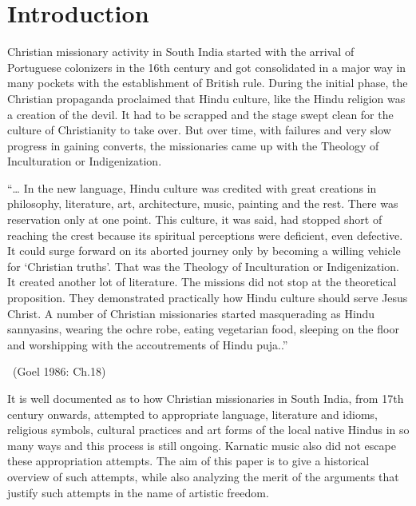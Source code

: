 \section*{Introduction}

Christian missionary activity in South India started with the arrival of Portuguese colonizers in the 16th century and got consolidated in a major way in many pockets with the establishment of British rule. During the initial phase, the Christian propaganda proclaimed that Hindu culture, like the Hindu religion was a creation of the devil. It had to be scrapped and the stage swept clean for the culture of Christianity to take over. But over time, with failures and very slow progress in gaining converts, the missionaries came up with the Theology of Inculturation or Indigenization.

\begin{myquote}
“… In the new language, Hindu culture was credited with great creations in philosophy, literature, art, architecture, music, painting and the rest. There was reservation only at one point. This culture, it was said, had stopped short of reaching the crest because its spiritual perceptions were deficient, even defective. It could surge forward on its aborted journey only by becoming a willing vehicle for ‘Christian truths’. That was the Theology of Inculturation or Indigenization. It created another lot of literature. The missions did not stop at the theoretical proposition. They demonstrated practically how Hindu culture should serve Jesus Christ. A number of Christian missionaries started masquerading as Hindu sannyasins, wearing the ochre robe, eating vegetarian food, sleeping on the floor and worshipping with the accoutrements of Hindu puja..” 

~\hfill (Goel 1986: Ch.18)
\end{myquote}

It is well documented as to how Christian missionaries in South India, from 17th century onwards, attempted to appropriate language, literature and idioms, religious symbols, cultural practices and art forms of the local native Hindus in so many ways and this process is still ongoing. Karnatic music also did not escape these appropriation attempts. The aim of this paper is to give a historical overview of such attempts, while also analyzing the merit of the arguments that justify such attempts in the name of artistic freedom.

\vspace{-.3cm}

